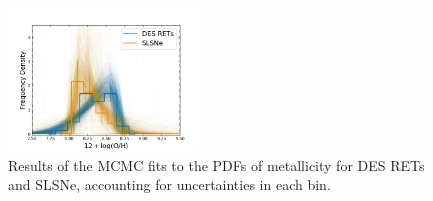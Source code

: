 \documentclass[fleqn,usenatbib,]{mnras}
\begin{document}
\begin{figure}
\includegraphics[width=0.45\textwidth]{mc_figs/rets_p16_OH_histfit_final.png}
\caption{Results of the MCMC fits to the PDFs of metallicity for DES RETs and SLSNe, accounting for uncertainties in each bin.
\label{fig:histfit_oh_p16}}
\end{figure}

\onecolumn


\bsp	%
\label{lastpage}
\end{document}
